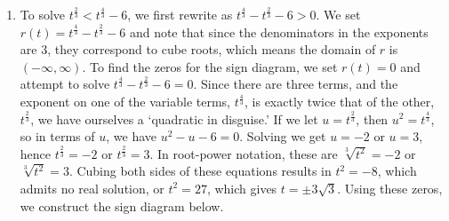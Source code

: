 \documentclass{ximera}
\begin{document}
\begin{example}
\begin{enumerate}
\begin{image}

% 
\end{image}

Since we are looking for where $r(x) =  2-\sqrt[4]{x+3} \geq 0$, we are looking for the zeros of $r$ along with the intervals over which $r(x)$ is $(+)$.  We record our answer as $[-3, 13]$.  Using desmos, we graph $y = 2-\sqrt[4]{x+3}$, and we can see that, indeed, the graph is above the $x$-axis ($y=0$) from $[-3, 13)$ and meets the $x$-axis at $x=13$, verifying our answer.



\begin{center}
\end{center}



\item  To solve $t^{\frac{2}{3}} < t^{\frac{4}{3}} - 6$, we first rewrite as  $t^{\frac{4}{3}} -t^{\frac{2}{3}} - 6 > 0$.  We set $r(t) = t^{\frac{4}{3}} -t^{\frac{2}{3}} - 6$ and note that since the denominators in the exponents are $3$, they correspond to cube roots, which means the domain of $r$ is $(-\infty, \infty)$. To find the zeros for the sign diagram, we set $r(t) = 0$ and attempt to solve $t^{\frac{4}{3}} - t^{\frac{2}{3}} - 6 = 0$.   Since there are three terms, and the exponent on one of the variable terms, $t^{\frac{4}{3}}$, is exactly twice that of the other, $t^{\frac{2}{3}}$, we have ourselves a `quadratic in disguise.'   If we let $u = t^{\frac{2}{3}}$, then $u^2 = t^{\frac{4}{3}}$, so  in terms of $u$, we have $u^2 - u - 6 = 0$.  Solving  we get $u = -2$ or $u = 3$, hence  $t^{\frac{2}{3}} = -2$ or $t^{\frac{2}{3}} = 3$.  In root-power notation, these are $\sqrt[3]{t^2} = -2$ or $\sqrt[3]{t^2}= 3$.  Cubing both sides of these equations results in $t^2 = -8$, which admits no real solution, or $t^2 = 27$, which gives $t = \pm 3 \sqrt{3}$.  Using these zeros, we construct the sign diagram below.  

\begin{image}


\end{image}
\end{enumerate}
\end{example}
\end{document}
